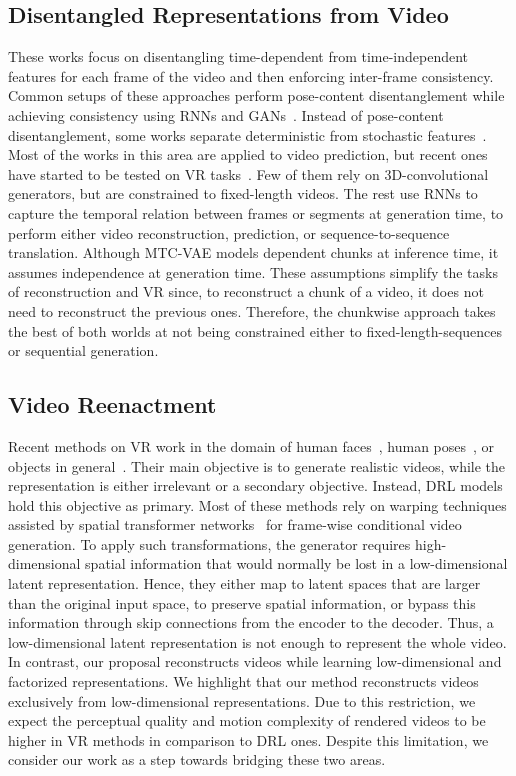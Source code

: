 \documentclass[journal]{IEEEtran}
\begin{document}
\subsection{Disentangled Representations from Video}
\label{sec:soa_vdrl}
These works focus on disentangling time-dependent from time-independent features for each frame of the video and then enforcing inter-frame consistency.
Common setups of these approaches perform pose-content disentanglement while achieving consistency using RNNs and GANs~\cite{Denton2017, Villegas2017, Hsieh2018, Ge2018}.
Instead of pose-content disentanglement, some works separate deterministic from stochastic features~\cite{Denton2018, Lee2019savp}.
Most of the works in this area are applied to video prediction, but recent ones have started to be tested on VR tasks~\cite{Li2018,Wang2020,Aich2020,Zhu2020}.
Few of them \cite{Wang2020, Aich2020} rely on 3D-convolutional generators, but are constrained to fixed-length videos.
The rest use RNNs to capture the temporal relation between frames or segments at generation time, to perform either video reconstruction, prediction, or sequence-to-sequence translation.
Although MTC-VAE models dependent chunks at inference time, it assumes independence at generation time.
These assumptions simplify the tasks of reconstruction and VR since, to reconstruct a chunk of a video, it does not need to reconstruct the previous ones.
Therefore, the chunkwise approach takes the best of both worlds at not being constrained either to fixed-length-sequences or sequential generation.

\subsection{Video Reenactment}
\label{sec:soa_vr}
Recent methods on VR work in the domain of human faces~\cite{Zakharov2019, Nirkin2019, Chen2018, Zhou2019aaai}, human poses~\cite{Chan2019, Zhou2019, Liu2019tg, Yang2020}, or objects in general~\cite{Bansal2018, Siarohin2019, Siarohin2021, Zhao2018, Xie2020}.
Their main objective is to generate realistic videos, while the representation is either irrelevant or a secondary objective.
Instead, DRL models hold this objective as primary.
Most of these methods rely on warping techniques assisted by spatial transformer networks~\cite{Jaderberg2015} for frame-wise conditional video generation.
To apply such transformations, the generator requires high-dimensional spatial information that would normally be lost in a low-dimensional latent representation.
Hence, they either map to latent spaces that are larger than the original input space, to preserve spatial information, or bypass this information through skip connections from the encoder to the decoder.
Thus, a low-dimensional latent representation is not enough to represent the whole video.
In contrast, our proposal reconstructs videos while learning low-dimensional and factorized representations.
We highlight that our method reconstructs videos exclusively from low-dimensional representations.
Due to this restriction, we expect the perceptual quality and motion complexity of rendered videos to be higher in VR methods in comparison to DRL ones.
Despite this limitation, we consider our work as a step towards bridging these two areas.
\end{document}
